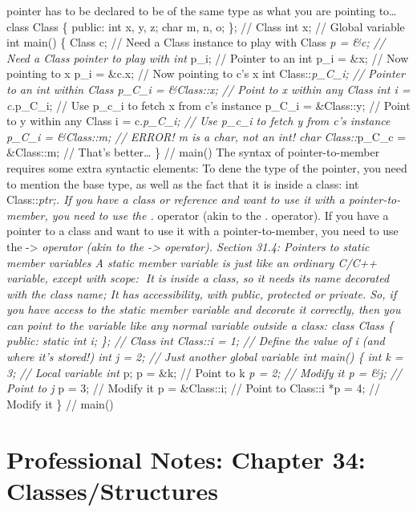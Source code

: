 pointer has to be declared to be of the same type as what you are
pointing to\ldots{} class Class \{ public: int x, y, z; char m, n, o;
\}; // Class int x; // Global variable int main() \{ Class c; // Need a
Class instance to play with Class \emph{p = \&c; // Need a Class pointer
to play with int }p\_i; // Pointer to an int p\_i = \&x; // Now pointing
to x p\_i = \&c.x; // Now pointing to c's x int Class::\emph{p\_C\_i; //
Pointer to an int within Class p\_C\_i = \&Class::x; // Point to x
within any Class int i = c.}p\_C\_i; // Use p\_c\_i to fetch x from c's
instance p\_C\_i = \&Class::y; // Point to y within any Class i =
c.\emph{p\_C\_i; // Use p\_c\_i to fetch y from c's instance p\_C\_i =
\&Class::m; // ERROR! m is a char, not an int! char Class::}p\_C\_c =
\&Class::m; // That's better\ldots{} \} // main() The syntax of
pointer-to-member requires some extra syntactic elements: To dene the
type of the pointer, you need to mention the base type, as well as the
fact that it is inside a class: int Class::\emph{ptr;. If you have a
class or reference and want to use it with a pointer-to-member, you need
to use the .} operator (akin to the . operator). If you have a pointer
to a class and want to use it with a pointer-to-member, you need to use
the -\textgreater{}\emph{ operator (akin to the -\textgreater{}
operator). Section 31.4: Pointers to static member variables A static
member variable is just like an ordinary C/C++ variable, except with
scope: It is inside a class, so it needs its name decorated with the
class name; It has accessibility, with public, protected or private. So,
if you have access to the static member variable and decorate it
correctly, then you can point to the variable like any normal variable
outside a class: class Class \{ public: static int i; \}; // Class int
Class::i = 1; // Define the value of i (and where it's stored!) int j =
2; // Just another global variable int main() \{ int k = 3; // Local
variable int }p; p = \&k; // Point to k \emph{p = 2; // Modify it p =
\&j; // Point to j }p = 3; // Modify it p = \&Class::i; // Point to
Class::i *p = 4; // Modify it \} // main()

\hypertarget{professional-notes-chapter-34-classesstructures-1}{%
\chapter{Professional Notes: Chapter 34:
Classes/Structures}\label{professional-notes-chapter-34-classesstructures-1}}

